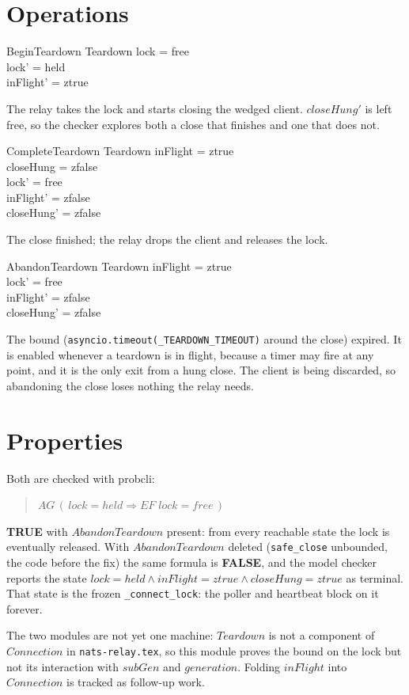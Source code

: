 \documentclass[a4paper,10pt,fleqn]{article}
\begin{document}
\section{Operations}

\begin{schema}{BeginTeardown}
  \Delta Teardown
  \where
  lock = free \\
  lock' = held \\
  inFlight' = ztrue
\end{schema}

The relay takes the lock and starts closing the wedged client.
$closeHung'$ is left free, so the checker explores both a close that
finishes and one that does not.

\begin{schema}{CompleteTeardown}
  \Delta Teardown
  \where
  inFlight = ztrue \\
  closeHung = zfalse \\
  lock' = free \\
  inFlight' = zfalse \\
  closeHung' = zfalse
\end{schema}

The close finished; the relay drops the client and releases the lock.

\begin{schema}{AbandonTeardown}
  \Delta Teardown
  \where
  inFlight = ztrue \\
  lock' = free \\
  inFlight' = zfalse \\
  closeHung' = zfalse
\end{schema}

The bound (\texttt{asyncio.timeout(\_TEARDOWN\_TIMEOUT)} around the close)
expired.  It is enabled whenever a teardown is in flight, because a timer
may fire at any point, and it is the only exit from a hung close.  The
client is being discarded, so abandoning the close loses nothing the relay
needs.

\section{Properties}

Both are checked with probcli:

\begin{quote}
  $AG\,(\,lock = held \Rightarrow EF\;lock = free\,)$
\end{quote}

\textbf{TRUE} with $AbandonTeardown$ present: from every reachable state
the lock is eventually released.  With $AbandonTeardown$ deleted
(\texttt{safe\_close} unbounded, the code before the fix) the same formula
is \textbf{FALSE}, and the model checker reports the state $lock = held \land inFlight = ztrue \land
closeHung = ztrue$ as terminal.  That state is the frozen
\texttt{\_connect\_lock}: the poller and heartbeat block on it forever.

The two modules are not yet one machine: $Teardown$ is not a component of
$Connection$ in \texttt{nats-relay.tex}, so this module proves the bound on
the lock but not its interaction with $subGen$ and $generation$.  Folding
$inFlight$ into $Connection$ is tracked as follow-up work.
\end{document}
